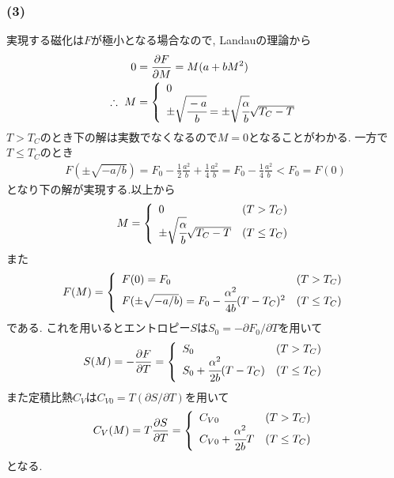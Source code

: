 \documentclass[uplatex,a4j,11pt,dvipdfmx]{jsarticle}
\begin{document}
\subsubsection*{(3)}
実現する磁化は$F$が極小となる場合なので,
Landauの理論から
\begin{align}
  \begin{split}    
    0&=\frac{\partial F}{\partial M}=M(a+bM^2)\\
    \therefore\ 
    M&=\left\{
      \begin{array}{l}
        0\\
        \pm\sqrt{\cfrac{-a}{b}}=\pm\sqrt{\cfrac{\alpha}{b}}\sqrt{T_C-T}
    \end{array}
    \right.
  \end{split}
\end{align}
$T>T_C$のとき下の解は実数でなくなるので$M=0$となることがわかる.
一方で$T\leq T_C$のとき
\begin{align}
  F(\pm\sqrt{-a/b})=F_0-\frac{1}{2}\frac{a^2}{b}+\frac{1}{4}\frac{a^2}{b}=F_0-\frac{1}{4}\frac{a^2}{b}<F_0=F(0)
\end{align}
となり下の解が実現する.以上から
\begin{align}
  M=\left\{
    \begin{array}{ll}
      0&(T>T_C)\\
      \pm\sqrt{\cfrac{\alpha}{b}}\sqrt{T_C-T}&(T\leq T_C)
  \end{array}\right.
\end{align}
また
\begin{align}
  F(M)=\left\{
    \begin{array}{ll}
      F(0)=F_0&(T>T_C)\\
      F(\pm\sqrt{-a/b})=F_0-\cfrac{\alpha^2}{4b}(T-T_C)^2&(T\leq T_C)
    \end{array}\right.
\end{align}
である.
これを用いるとエントロピー$S$は$S_0=-\partial F_0/\partial T$を用いて
\begin{align}
  S(M)=-\frac{\partial F}{\partial T}=\left\{
    \begin{array}{ll}
      S_0&(T>T_C)\\
      S_0+\cfrac{\alpha^2}{2b}(T-T_C)&(T\leq T_C)
    \end{array}\right.
\end{align}
また定積比熱$C_V$は$C_{V0}=T(\partial S/\partial T)$を用いて
\begin{align}
  C_V(M)=T\frac{\partial S}{\partial T}=\left\{
    \begin{array}{ll}
      C_{V0}&(T>T_C)\\
      C_{V0}+\cfrac{\alpha^2}{2b}T&(T\leq T_C)
    \end{array}\right.
\end{align}
となる.
\end{document}
